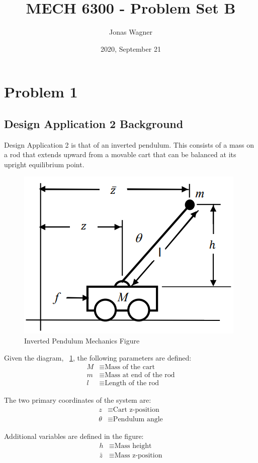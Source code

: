 \documentclass[]{article}
\title{MECH 6300 - Problem Set B}
\author{Jonas Wagner}
\date{2020, September 21}
\begin{document}
\maketitle


\section{Problem 1}

	\subsection{Design Application 2 Background}
	
		Design Application 2 is that of an inverted pendulum. This consists of a mass on a rod that extends upward from a movable cart that can be balanced at its upright equilibrium point.
		
		\begin{figure}[h]
			\centering
			\includegraphics[width=0.5\linewidth]{Fig/DesignApplication2}
			\caption[]{Inverted Pendulum Mechanics Figure}
			\label{fig:designapplication2}
		\end{figure}
		
		Given the diagram, \figurename \ \ref{fig:designapplication2}, the following parameters are defined:
		\begin{align*}
			M &\equiv \text{Mass of the cart}\\
			m &\equiv \text{Mass at end of the rod}\\
			l &\equiv \text{Length of the rod}
		\end{align*}
		
		The two primary coordinates of the system are:
		\begin{align*}
			z &\equiv \text{Cart z-position}\\
			\theta &\equiv \text{Pendulum angle}
		\end{align*}
		
		Additional variables are defined in the figure:
		\begin{align*}
			h &\equiv \text{Mass height}\\
			\bar{z} &\equiv \text{Mass z-position}
		\end{align*} 
		
\end{document}
